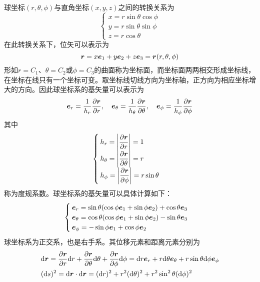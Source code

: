 球坐标$(r,\theta,\phi)$与直角坐标$(x,y,z)$之间的转换关系为
\begin{equation}
	\begin{cases}
		x = r\sin \theta \cos \phi \\
		y = r\sin \theta \sin \phi \\
		z = r\cos \theta
	\end{cases}
\end{equation}
在此转换关系下，位矢可以表示为
\begin{equation}
	\boldsymbol{r} = x\boldsymbol{e}_1 + y\boldsymbol{e}_2 + z\boldsymbol{e}_3 = \boldsymbol{r}(r,\theta,\phi)
\end{equation}
形如$r = C_1$、$\theta = C_2$或$\phi = C_3$的曲面称为{\heiti 坐标面}，而坐标面两两相交形成{\heiti 坐标线}，在坐标在线只有一个坐标可变。取坐标线切线方向为坐标轴，正方向为相应坐标增大的方向。因此球坐标系的基矢量可以表示为
\begin{equation}
	\boldsymbol{e}_r = \frac{1}{h_r} \frac{\partial \boldsymbol{r}}{\partial r},\quad \boldsymbol{e}_\theta = \frac{1}{h_\theta} \frac{\partial \boldsymbol{r}}{\partial \theta},\quad \boldsymbol{e}_\phi = \frac{1}{h_\phi} \frac{\partial \boldsymbol{r}}{\partial \phi}
\end{equation}
其中
\begin{equation}
	\begin{cases}
		h_r = \left|\dfrac{\partial \boldsymbol{r}}{\partial r}\right| = 1 \\
		h_\theta = \left|\dfrac{\partial \boldsymbol{r}}{\partial \theta}\right| = r \\
		h_\phi = \left|\dfrac{\partial \boldsymbol{r}}{\partial \phi}\right| = r\sin \theta
	\end{cases}
\end{equation}
称为{\heiti 度规系数}。球坐标系的基矢量可以具体计算如下：
\begin{equation}
	\begin{cases}
		\boldsymbol{e}_r = \sin \theta(\cos \phi \boldsymbol{e}_1 + \sin \phi \boldsymbol{e}_2) + \cos \theta \boldsymbol{e}_3 \\
		\boldsymbol{e}_\theta = \cos \theta(\cos \phi \boldsymbol{e}_1 + \sin \phi \boldsymbol{e}_2) - \sin \theta \boldsymbol{e}_3 \\
		\boldsymbol{e}_\phi = -\sin \phi \boldsymbol{e}_1 + \cos \phi \boldsymbol{e}_2
	\end{cases}
\end{equation}
球坐标系为正交系，也是右手系。其位移元素和距离元素分别为
\begin{align*}
	& \mathrm{d} \boldsymbol{r} = \frac{\partial \boldsymbol{r}}{\partial r} \mathrm{d} r + \frac{\partial \boldsymbol{r}}{\partial \theta} \mathrm{d} \theta + \frac{\partial \boldsymbol{r}}{\partial \phi} \mathrm{d} \phi = \mathrm{d} r \boldsymbol{e}_r + r\mathrm{d} \theta \boldsymbol{e}_\theta + r\sin \theta \mathrm{d} \phi \boldsymbol{e}_\phi \\
	& (\mathrm{d} s)^2 = \mathrm{d} \boldsymbol{r} \cdot \mathrm{d} \boldsymbol{r} = (\mathrm{d} r)^2 + r^2 (\mathrm{d} \theta)^2 + r^2 \sin^2 \theta (\mathrm{d} \phi)^2
\end{align*}

